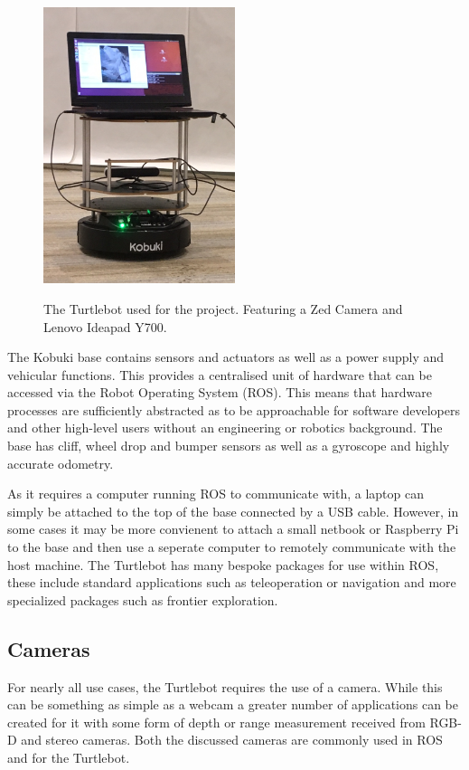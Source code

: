 \documentclass{mproj}
\begin{document}
\begin{figure}[h]
  \caption{The Turtlebot used for the project. Featuring a Zed Camera and Lenovo Ideapad Y700.}
  \centering
  \includegraphics[width=0.5\textwidth]{images/turtlebot.JPG}
  \label{fig:Turtlebot}
\end{figure}
 
The Kobuki base contains sensors and actuators as well as a power supply and vehicular functions. This provides a centralised unit of hardware that can be accessed via the Robot Operating System (ROS). This means that hardware processes are sufficiently abstracted as to be approachable for software developers and other high-level users without an engineering or robotics background. The base has cliff, wheel drop and bumper sensors as well as a gyroscope and highly accurate odometry. 

As it requires a computer running ROS to communicate with, a laptop can simply be attached to the top of the base connected by a USB cable. However, in some cases it may be more convienent to attach a small netbook or Raspberry Pi to the base and then use a seperate computer to remotely communicate with the host machine. The Turtlebot has many bespoke packages for use within ROS, these include standard applications such as teleoperation or navigation and more specialized packages such as frontier exploration. 


\subsection{Cameras}
For nearly all use cases, the Turtlebot requires the use of a camera. While this can be something as simple as a webcam a greater number of applications can be created for it with some form of depth or range measurement received from RGB-D and stereo cameras. Both the discussed cameras are commonly used in ROS and for the Turtlebot.
\end{document}
